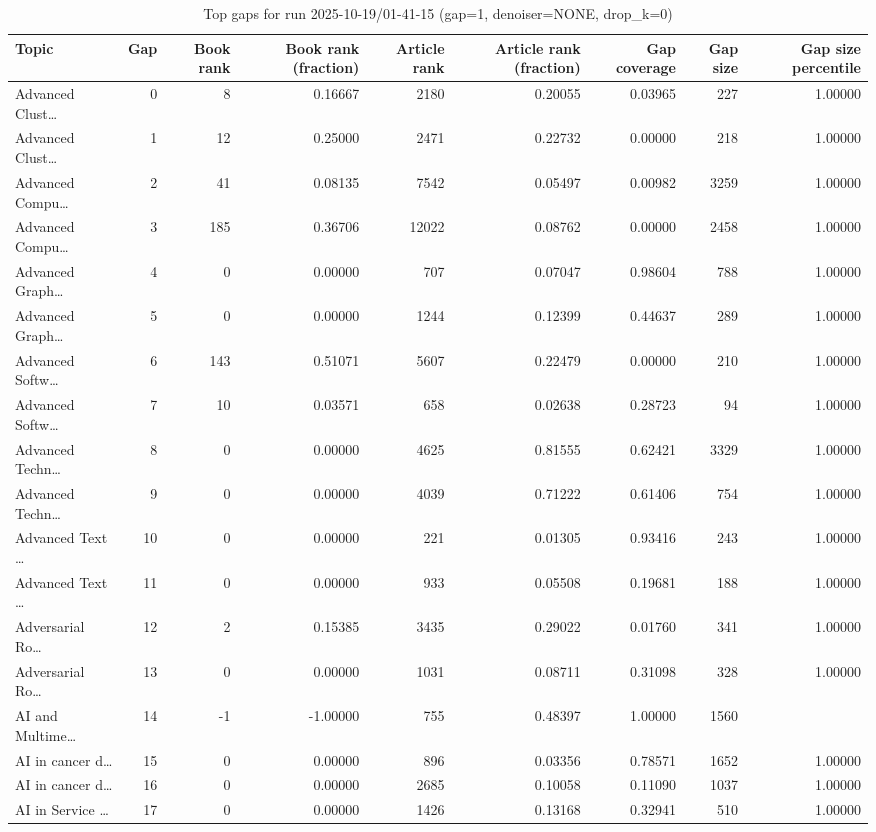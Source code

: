 \begin{table}
\caption{Top gaps for run 2025-10-19/01-41-15 (gap=1, denoiser=NONE, drop\_k=0)}
\label{tab:best_run_gap1_2025_10_19_01_41_15}
\begin{tabular}{lrrrrrrrr}
\toprule
Topic & Gap & Book rank & Book rank (fraction) & Article rank & Article rank (fraction) & Gap coverage & Gap size & Gap size percentile \\
\midrule
Advanced Clust… & 0 & 8 & 0.16667 & 2180 & 0.20055 & 0.03965 & 227 & 1.00000 \\
Advanced Clust… & 1 & 12 & 0.25000 & 2471 & 0.22732 & 0.00000 & 218 & 1.00000 \\
Advanced Compu… & 2 & 41 & 0.08135 & 7542 & 0.05497 & 0.00982 & 3259 & 1.00000 \\
Advanced Compu… & 3 & 185 & 0.36706 & 12022 & 0.08762 & 0.00000 & 2458 & 1.00000 \\
Advanced Graph… & 4 & 0 & 0.00000 & 707 & 0.07047 & 0.98604 & 788 & 1.00000 \\
Advanced Graph… & 5 & 0 & 0.00000 & 1244 & 0.12399 & 0.44637 & 289 & 1.00000 \\
Advanced Softw… & 6 & 143 & 0.51071 & 5607 & 0.22479 & 0.00000 & 210 & 1.00000 \\
Advanced Softw… & 7 & 10 & 0.03571 & 658 & 0.02638 & 0.28723 & 94 & 1.00000 \\
Advanced Techn… & 8 & 0 & 0.00000 & 4625 & 0.81555 & 0.62421 & 3329 & 1.00000 \\
Advanced Techn… & 9 & 0 & 0.00000 & 4039 & 0.71222 & 0.61406 & 754 & 1.00000 \\
Advanced Text … & 10 & 0 & 0.00000 & 221 & 0.01305 & 0.93416 & 243 & 1.00000 \\
Advanced Text … & 11 & 0 & 0.00000 & 933 & 0.05508 & 0.19681 & 188 & 1.00000 \\
Adversarial Ro… & 12 & 2 & 0.15385 & 3435 & 0.29022 & 0.01760 & 341 & 1.00000 \\
Adversarial Ro… & 13 & 0 & 0.00000 & 1031 & 0.08711 & 0.31098 & 328 & 1.00000 \\
AI and Multime… & 14 & -1 & -1.00000 & 755 & 0.48397 & 1.00000 & 1560 &  \\
AI in cancer d… & 15 & 0 & 0.00000 & 896 & 0.03356 & 0.78571 & 1652 & 1.00000 \\
AI in cancer d… & 16 & 0 & 0.00000 & 2685 & 0.10058 & 0.11090 & 1037 & 1.00000 \\
AI in Service … & 17 & 0 & 0.00000 & 1426 & 0.13168 & 0.32941 & 510 & 1.00000 \\

\end{tabular}
\end{table}
